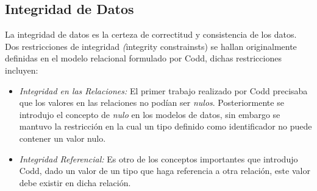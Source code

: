 \subsection{Integridad de Datos}
\noindent La integridad de datos es la certeza de correctitud y consistencia de los datos.\\
\noindent Dos restricciones de integridad \textit(integrity constrainsts) se hallan originalmente definidas en el modelo relacional
\noindent formulado por Codd, dichas restricciones incluyen:
\begin{itemize}
    \item \textit {Integridad en las Relaciones:} El primer trabajo realizado por Codd precisaba que los valores en las
                   relaciones no podían ser \textit{nulos}. Posteriormente se introdujo el concepto de \textit{nulo} en los
                   modelos de datos, sin embargo se mantuvo la restricción en la cual un tipo definido como
                   identificador no puede contener un valor nulo.
    \item \textit {Integridad Referencial:} Es otro de los conceptos importantes que introdujo Codd, dado un valor  de un tipo
                   que haga referencia a otra relación, este valor debe existir en dicha relación.
\end{itemize}
